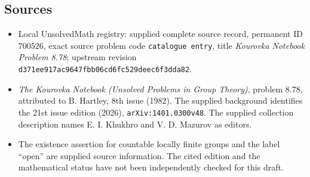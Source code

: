 \documentclass[11pt]{article}
\begin{document}
\subsection{Sources}
\begin{itemize}
\item Local UnsolvedMath registry: supplied complete source record, permanent ID \(700526\), exact source problem code \texttt{catalogue entry}, title \emph{Kourovka Notebook Problem 8.78}; upstream revision \texttt{d371ee917ac9647fbb06cd6fc529deec6f3dda82}.
\item \emph{The Kourovka Notebook (Unsolved Problems in Group Theory)}, problem 8.78, attributed to B. Hartley, 8th issue (1982). The supplied background identifies the 21st issue edition (2026), \texttt{arXiv:1401.0300v48}. The supplied collection description names E. I. Khukhro and V. D. Mazurov as editors.
\item The existence assertion for countable locally finite groups and the label ``open'' are supplied source information. The cited edition and the mathematical status have not been independently checked for this draft.
\end{itemize}
\end{document}
